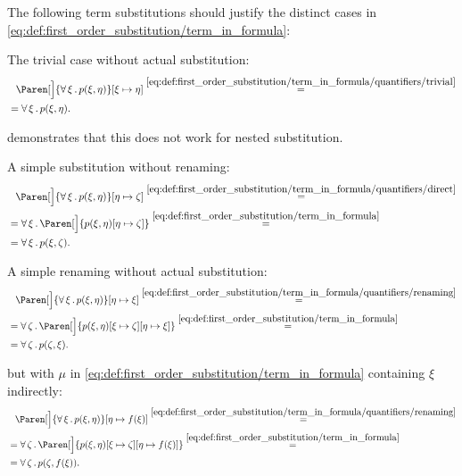 \begin{example}\label{ex:first_order_substitution}
  The following term substitutions should justify the distinct cases in \eqref{eq:def:first_order_substitution/term_in_formula}:
  \begin{ExEnum}
     The trivial case without actual substitution:
    \begin{align*}
      &{}\phantom{=}{}
      \Paren[\Big]{\ForAll{\xi} p(\xi, \eta)}[\xi \mapsto \eta]
      \overset {\eqref{eq:def:first_order_substitution/term_in_formula/quantifiers/trivial}} = \\ &=
      \ForAll{\xi} p(\xi, \eta).
    \end{align*}

     demonstrates that this does not work for nested substitution.

     A simple substitution without renaming:
    \begin{align*}
      &{}\phantom{=}{}
      \Paren[\Big]{\ForAll{\xi} p(\xi, \eta)}[\eta \mapsto \zeta]
      \overset {\eqref{eq:def:first_order_substitution/term_in_formula/quantifiers/direct}} = \\ &=
      \ForAll{\xi} \Paren[\Big]{p(\xi, \eta)[\eta \mapsto \zeta]}
      \overset {\eqref{eq:def:first_order_substitution/term_in_formula}} = \\ &=
      \ForAll{\xi} p(\xi, \zeta).
    \end{align*}

     A simple renaming without actual substitution:
    \begin{align*}
      &{}\phantom{=}{}
      \Paren[\Big]{\ForAll{\xi} p(\xi, \eta)}[\eta \mapsto \xi]
      \overset {\eqref{eq:def:first_order_substitution/term_in_formula/quantifiers/renaming}} = \\ &=
      \ForAll{\zeta} \Paren[\Big]{p(\xi, \eta)[\xi \mapsto \zeta][\eta \mapsto \xi]}
      \overset {\eqref{eq:def:first_order_substitution/term_in_formula}} = \\ &=
      \ForAll{\zeta} p(\zeta, \xi).
    \end{align*}

      but with \( \mu \) in \eqref{eq:def:first_order_substitution/term_in_formula} containing \( \xi \) indirectly:
    \begin{align*}
      &{}\phantom{=}{}
      \Paren[\Big]{\ForAll{\xi} p(\xi, \eta)}[\eta \mapsto f(\xi)]
      \overset {\eqref{eq:def:first_order_substitution/term_in_formula/quantifiers/renaming}} = \\ &=
      \ForAll{\zeta} \Paren[\Big]{p(\xi, \eta)[\xi \mapsto \zeta][\eta \mapsto f(\xi)]}
      \overset {\eqref{eq:def:first_order_substitution/term_in_formula}} = \\ &=
      \ForAll{\zeta} p(\zeta, f(\xi)).
    \end{align*}


\end{ExEnum}
\end{example}
